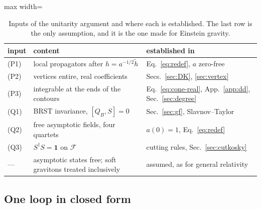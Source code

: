 \documentclass[a4paper,11pt]{article}
\begin{document}
\begin{table}[t]
\centering
\small\begin{adjustbox}{max width=\linewidth}\begin{tabular}{p{1.1cm}p{4.1cm}p{3.0cm}}
input & content & established in\\
\hline
(P1) & local propagators after $h=a^{-1/2}\tilde h$ & Eq.~\eqref{eq:redef}, $a$ zero-free\\
(P2) & vertices entire, real coefficients & Secs.~\ref{sec:DK}, \ref{sec:vertex}\\
(P3) & integrable at the ends of the contours & Eq.~\eqref{eq:cone-real}, App.~\ref{app:dd}, Sec.~\ref{sec:degree}\\
(Q1) & BRST invariance, $[Q_B,S]=0$ & Sec.~\ref{sec:gf}, Slavnov--Taylor\\
(Q2) & free asymptotic fields, four quartets & $a(0)=1$, Eq.~\eqref{eq:redef}\\
(Q3) & $S^\dagger S=\mathbf 1$ on $\mathcal F$ & cutting rules, Sec.~\ref{sec:cutkosky}\\
--- & asymptotic states free; soft gravitons treated inclusively & assumed, as for general relativity~\cite{KugoOjima1978,Weinberg1965}\\
\hline\hline
\end{tabular}\end{adjustbox}
\caption{Inputs of the unitarity argument and where each is established. The last row is the only assumption, and it is the one made for Einstein gravity.}
\label{tab:unitarity}
\end{table}

\subsection{One loop in closed form}
\label{sec:bubble}
\end{document}
